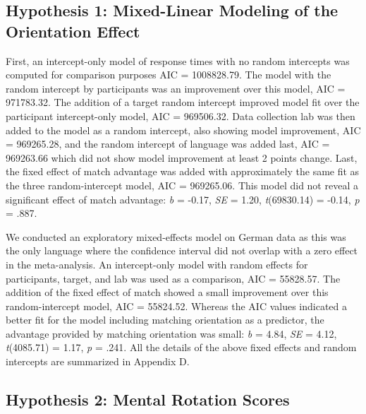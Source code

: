 \documentclass[
  man,floatsintext]{apa7}
\begin{document}
\hypertarget{hypothesis-1-mixed-linear-modeling-of-the-orientation-effect}{%
\subsection{Hypothesis 1: Mixed-Linear Modeling of the Orientation Effect}\label{hypothesis-1-mixed-linear-modeling-of-the-orientation-effect}}

First, an intercept-only model of response times with no random
intercepts was computed for comparison purposes AIC =
1008828.79. The
model with the random intercept by participants was an improvement over
this model, AIC =
971783.32. The
addition of a target random intercept improved model fit over the
participant intercept-only model, AIC =
969506.32. Data
collection lab was then added to the model as a random intercept, also
showing model improvement, AIC =
969265.28, and the
random intercept of language was added last, AIC =
969263.66 which did
not show model improvement at least 2 points change. Last, the fixed
effect of match advantage was added with approximately the same fit as
the three random-intercept model, AIC =
969265.06. This model
did not reveal a significant effect of match advantage: \emph{b} =
-0.17, \emph{SE} =
1.20,
\emph{t}(69830.14) =
-0.14, \emph{p} =
.887.

We conducted an exploratory mixed-effects model on German data as this
was the only language where the confidence interval did not overlap with
a zero effect in the meta-analysis. An intercept-only model with random
effects for participants, target, and lab was used as a comparison, AIC
= 55828.57. The
addition of the fixed effect of match showed a small improvement over
this random-intercept model, AIC =
55824.52.
Whereas the AIC values indicated a better fit for the model including
matching orientation as a predictor, the advantage provided by matching
orientation was small: \emph{b} =
4.84, \emph{SE} =
4.12,
\emph{t}(4085.71) =
1.17, \emph{p} =
.241. All the details of the above fixed
effects and random intercepts are summarized in Appendix D.

\hypertarget{hypothesis-2-mental-rotation-scores}{%
\subsection{Hypothesis 2: Mental Rotation Scores}\label{hypothesis-2-mental-rotation-scores}}
\end{document}
